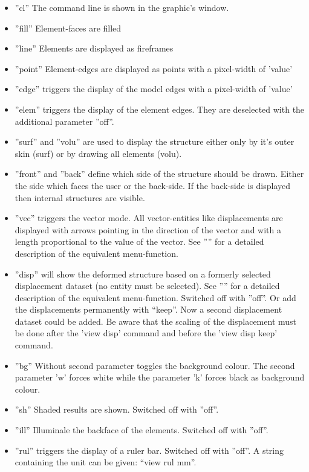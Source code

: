 \documentclass{article}
\begin{document}
\begin{itemize}
\item ''cl'' The command line is shown in the graphic's window. 
\item ''fill'' Element-faces are filled 
\item ''line'' Elements are displayed as fireframes
\item ''point'' Element-edges are displayed as points with a pixel-width of 'value'
\item ''edge'' triggers the display of the model edges with a pixel-width of 'value'
\item ''elem'' triggers the display of the element edges. They are deselected with the additional parameter ''off''.
\item ''surf'' and ''volu'' are used to display the structure either only by it's outer skin (surf) or by drawing all elements (volu). \item ''front'' and ''back'' define which side of the structure should be drawn. Either the side which faces the user or the back-side. If the back-side is displayed then internal structures are visible. 
\item ''vec'' triggers the vector mode. All vector-entities like displacements are displayed with arrows pointing in the direction of the vector and with a length proportional to the value of the vector. See '''' for a detailed description of the equivalent menu-function.
\item ''disp'' will show the deformed structure based on a formerly selected displacement dataset (no entity must be selected). See '''' for a detailed description of the equivalent menu-function. Switched off with ”off”. Or add the displacements permanently with ``keep''. Now a second displacement dataset could be added. Be aware that the scaling of the displacement must be done after the 'view disp' command and before the 'view disp keep' command.
\item ''bg'' Without second parameter toggles the background colour. The second parameter 'w' forces white while the parameter 'k' forces black as background colour.
\item ''sh'' Shaded results are shown. Switched off with ''off''. 
\item ''ill'' Illuminale the backface of the elements. Switched off with ''off''. 
\item ''rul'' triggers the display of a ruler bar. Switched off with ''off''. A string containing the unit can be given: ``view rul mm''. 
\end{itemize}  
\end{document}
